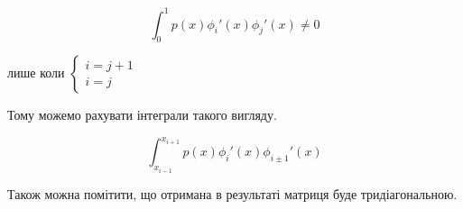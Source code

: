 \documentclass[14pt,a4paper]{scrartcl}
\begin{document}
	\begin{equation} \label{eq5}
	\int_{0}^{1} p(x)\phi_{i}'(x)\phi_{j}'(x) \ne 0 
	\end{equation}
	
	лише коли $ \left\{
	\begin{array}{ll}
	i = j+1 \\
	i = j
	\end{array}
$
	
	Тому можемо рахувати інтеграли такого вигляду.
	
	\begin{equation} \label{eq6}
	\int_{x_{i-1}}^{x_{i+1}} p(x)\phi_{i}'(x)\phi_{i \pm 1}'(x)
	\end{equation}
	
	Також можна помітити, що отримана в результаті матриця буде тридіагональною. 


	
	


	
\end{document}
